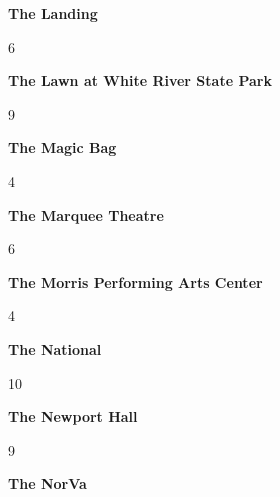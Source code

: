 \begin{center}\textbf{The Landing}\end{center}
\begin{center}6\end{center} 
\newline 
\begin{center}\textbf{The Lawn at White River State Park}\end{center}
\begin{center}9\end{center} 
\newline 
\begin{center}\textbf{The Magic Bag}\end{center}
\begin{center}4\end{center} 
\newline 
\begin{center}\textbf{The Marquee Theatre}\end{center}
\begin{center}6\end{center} 
\newline 
\begin{center}\textbf{The Morris Performing Arts Center}\end{center}
\begin{center}4\end{center} 
\newline 
\begin{center}\textbf{The National}\end{center}
\begin{center}10\end{center} 
\newline 
\begin{center}\textbf{The Newport Hall}\end{center}
\begin{center}9\end{center} 
\newline 
\begin{center}\textbf{The NorVa}\end{center}
